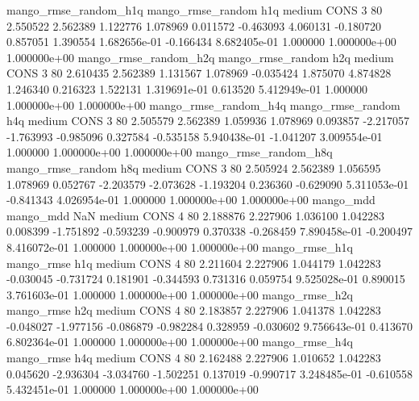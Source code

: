 mango_rmse_random_h1q mango_rmse_random                  h1q     medium     CONS                 3 80  2.550522       2.562389 1.122776       1.078969    0.011572     -0.463093      4.060131    -0.180720       0.857051  1.390554 1.682656e-01    -0.166434   8.682405e-01            1.000000    1.000000e+00        1.000000e+00
mango_rmse_random_h2q mango_rmse_random                  h2q     medium     CONS                 3 80  2.610435       2.562389 1.131567       1.078969   -0.035424      1.875070      4.874828     1.246340       0.216323  1.522131 1.319691e-01     0.613520   5.412949e-01            1.000000    1.000000e+00        1.000000e+00
mango_rmse_random_h4q mango_rmse_random                  h4q     medium     CONS                 3 80  2.505579       2.562389 1.059936       1.078969    0.093857     -2.217057     -1.763993    -0.985096       0.327584 -0.535158 5.940438e-01    -1.041207   3.009554e-01            1.000000    1.000000e+00        1.000000e+00
mango_rmse_random_h8q mango_rmse_random                  h8q     medium     CONS                 3 80  2.505924       2.562389 1.056595       1.078969    0.052767     -2.203579     -2.073628    -1.193204       0.236360 -0.629090 5.311053e-01    -0.841343   4.026954e-01            1.000000    1.000000e+00        1.000000e+00
            mango_mdd         mango_mdd                  NaN     medium     CONS                 4 80  2.188876       2.227906 1.036100       1.042283    0.008399     -1.751892     -0.593239    -0.900979       0.370338 -0.268459 7.890458e-01    -0.200497   8.416072e-01            1.000000    1.000000e+00        1.000000e+00
       mango_rmse_h1q        mango_rmse                  h1q     medium     CONS                 4 80  2.211604       2.227906 1.044179       1.042283   -0.030045     -0.731724      0.181901    -0.344593       0.731316  0.059754 9.525028e-01     0.890015   3.761603e-01            1.000000    1.000000e+00        1.000000e+00
       mango_rmse_h2q        mango_rmse                  h2q     medium     CONS                 4 80  2.183857       2.227906 1.041378       1.042283   -0.048027     -1.977156     -0.086879    -0.982284       0.328959 -0.030602 9.756643e-01     0.413670   6.802364e-01            1.000000    1.000000e+00        1.000000e+00
       mango_rmse_h4q        mango_rmse                  h4q     medium     CONS                 4 80  2.162488       2.227906 1.010652       1.042283    0.045620     -2.936304     -3.034760    -1.502251       0.137019 -0.990717 3.248485e-01    -0.610558   5.432451e-01            1.000000    1.000000e+00        1.000000e+00
